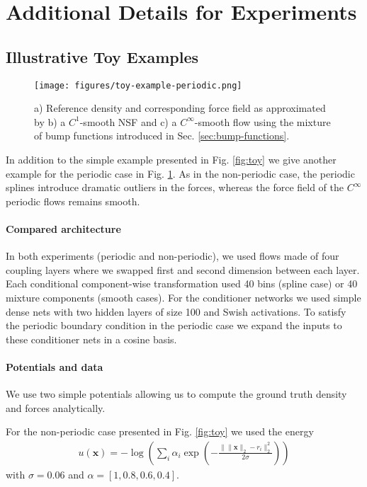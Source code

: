 \documentclass{article}
\begin{document}
\section{Additional Details for Experiments}

\subsection{Illustrative Toy Examples}

\begin{figure}[htbp]
    \centering
    \texttt{[image: figures/toy-example-periodic.png]}
    \caption{a) Reference density and corresponding force field as approximated by b) a $C^{1}$-smooth NSF and c) a $C^{\infty}$-smooth flow using the mixture of bump functions introduced in Sec. \ref{sec:bump-functions}.}
    \label{fig:toy-periodic}
\end{figure}

In addition to the simple example presented in Fig. \ref{fig:toy} we give another example for the periodic case in Fig. \ref{fig:toy-periodic}. As in the non-periodic case, the periodic splines introduce dramatic outliers in the forces, whereas the force field of the $C^{\infty}$ periodic flows remains smooth.

\paragraph{Compared architecture}
In both experiments (periodic and non-periodic), we used flows made of four coupling layers where we swapped first and second dimension between each layer. Each conditional component-wise transformation used 40 bins (spline case) or 40 mixture components (smooth cases). For the conditioner networks we used simple dense nets with two hidden layers of size 100 and Swish activations. To satisfy the periodic boundary condition in the periodic case we expand the inputs to these conditioner nets in a cosine basis. 

\paragraph{Potentials and data}
We use two simple potentials allowing us to compute the ground truth density and forces analytically.

For the non-periodic case presented in Fig. \ref{fig:toy} we used the energy 
\begin{align}
    u(\bm x) = -\log\left(\sum_{i} \alpha_{i} \exp\left(-\frac{\| \|\bm x\|_2 - r_{i}\|_2^2}{2 \sigma}\right) \right)
\end{align}
with $\sigma = 0.06$ and $\alpha =\left[ 1, 0.8, 0.6, 0.4 \right]$.
\end{document}
